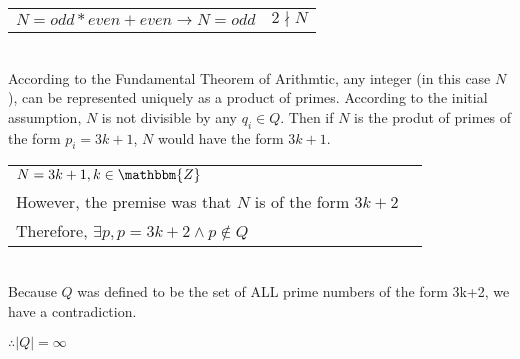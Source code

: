 \documentclass[11pt]{article}
\def\AND{\wedge}
\def\imp{\rightarrow}
\begin{document}
\begin{enumerate}
		\begin{tabular}{ll}

			$N = odd * even + even \imp N = odd$ & $2 \nmid N$ \\
			
		\end{tabular} \\

		According to the Fundamental Theorem of Arithmtic, any integer (in this case $N$), 
		can be represented uniquely as a product of primes. According to the initial
		assumption, $N$ is not divisible by any $q_i \in Q$. Then if $N$ is the produt of 
		primes of the form $p_i = 3k + 1$, $N$ would have the form $3k+1$.

		\begin{tabular}{ll}

			$N = 3k + 1, k \in \mathbbm{Z}$ \\

			However, the premise was that $N$ is of the form $3k + 2$ \\

			Therefore, $\exists p, p = 3k + 2 \AND p \not\in Q$ \\

		\end{tabular} \\

		Because $Q$ was defined to be the set of ALL prime numbers of the form 3k+2, we
		have a contradiction. 

		$\therefore |Q| = \infty$ \\

\end{enumerate}
\end{document}
